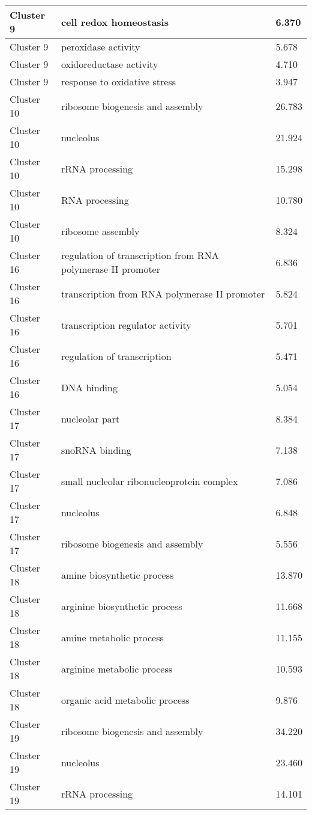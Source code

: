 {\begin{longtable}{|p{1in}|p{4in}|p{1in}|}
Cluster 9 & cell redox homeostasis & 6.370 \\ \hline
Cluster 9 & peroxidase activity & 5.678 \\ \hline
Cluster 9 & oxidoreductase activity & 4.710 \\ \hline
Cluster 9 & response to oxidative stress & 3.947 \\ \hline
Cluster 10 & ribosome biogenesis and assembly & 26.783 \\ \hline
Cluster 10 & nucleolus & 21.924 \\ \hline
Cluster 10 & rRNA processing & 15.298 \\ \hline
Cluster 10 & RNA processing & 10.780 \\ \hline
Cluster 10 & ribosome assembly & 8.324 \\ \hline
Cluster 16 & regulation of transcription from RNA polymerase II promoter & 6.836 \\ \hline
Cluster 16 & transcription from RNA polymerase II promoter & 5.824 \\ \hline
Cluster 16 & transcription regulator activity & 5.701 \\ \hline
Cluster 16 & regulation of transcription & 5.471 \\ \hline
Cluster 16 & DNA binding & 5.054 \\ \hline
Cluster 17 & nucleolar part & 8.384 \\ \hline
Cluster 17 & snoRNA binding & 7.138 \\ \hline
Cluster 17 & small nucleolar ribonucleoprotein complex & 7.086 \\ \hline
Cluster 17 & nucleolus & 6.848 \\ \hline
Cluster 17 & ribosome biogenesis and assembly & 5.556 \\ \hline
Cluster 18 & amine biosynthetic process & 13.870 \\ \hline
Cluster 18 & arginine biosynthetic process & 11.668 \\ \hline
Cluster 18 & amine metabolic process & 11.155 \\ \hline
Cluster 18 & arginine metabolic process & 10.593 \\ \hline
Cluster 18 & organic acid metabolic process & 9.876 \\ \hline
Cluster 19 & ribosome biogenesis and assembly & 34.220 \\ \hline
Cluster 19 & nucleolus & 23.460 \\ \hline
Cluster 19 & rRNA processing & 14.101 \\ \hline

\end{longtable}}
